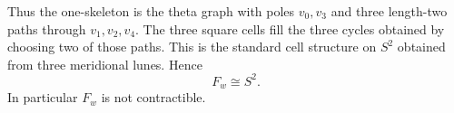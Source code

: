 \documentclass[12pt]{article}
\begin{document}
Thus the one-skeleton is the theta graph with poles \(v_0,v_3\) and
three length-two paths through \(v_1,v_2,v_4\).  The three square cells
fill the three cycles obtained by choosing two of those paths.  This is
the standard cell structure on \(S^2\) obtained from three meridional
lunes.  Hence
\[
        F_w \cong S^2.
\]
In particular \(F_w\) is not contractible.
\end{document}
